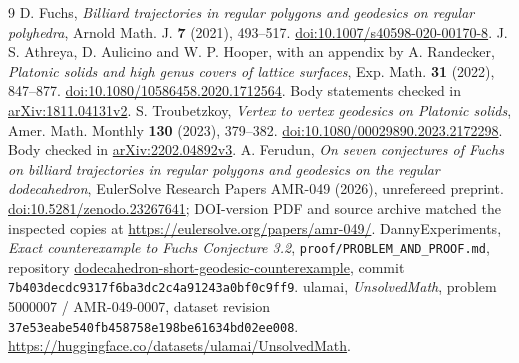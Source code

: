 \documentclass[11pt]{amsart}
\theoremstyle{remark}
\begin{document}
\begin{thebibliography}{9}
D. Fuchs, \emph{Billiard trajectories in regular polygons and geodesics on regular polyhedra},
Arnold Math. J. \textbf{7} (2021), 493--517.
\href{https://doi.org/10.1007/s40598-020-00170-8}{doi:10.1007/s40598-020-00170-8}.
J. S. Athreya, D. Aulicino and W. P. Hooper, with an appendix by A. Randecker,
\emph{Platonic solids and high genus covers of lattice surfaces},
Exp. Math. \textbf{31} (2022), 847--877.
\href{https://doi.org/10.1080/10586458.2020.1712564}{doi:10.1080/10586458.2020.1712564}.
Body statements checked in \href{https://arxiv.org/abs/1811.04131v2}{arXiv:1811.04131v2}.
S. Troubetzkoy, \emph{Vertex to vertex geodesics on Platonic solids},
Amer. Math. Monthly \textbf{130} (2023), 379--382.
\href{https://doi.org/10.1080/00029890.2023.2172298}{doi:10.1080/00029890.2023.2172298}.
Body checked in \href{https://arxiv.org/abs/2202.04892v3}{arXiv:2202.04892v3}.
A. Ferudun, \emph{On seven conjectures of Fuchs on billiard trajectories in regular polygons and geodesics on the regular dodecahedron},
EulerSolve Research Papers AMR-049 (2026), unrefereed preprint.
\href{https://doi.org/10.5281/zenodo.23267641}{doi:10.5281/zenodo.23267641};
DOI-version PDF and source archive matched the inspected copies at \url{https://eulersolve.org/papers/amr-049/}.
DannyExperiments, \emph{Exact counterexample to Fuchs Conjecture 3.2},
\texttt{proof/PROBLEM\_AND\_PROOF.md}, repository
\href{https://github.com/DannyExperiments/dodecahedron-short-geodesic-counterexample}{dodecahedron-short-geodesic-counterexample},
commit \texttt{7b403decdc9317f6ba3dc2c4a91243a0bf0c9ff9}.
ulamai, \emph{UnsolvedMath}, problem 5000007 / AMR-049-0007,
dataset revision \texttt{37e53eabe540fb458758e198be61634bd02ee008}.
\url{https://huggingface.co/datasets/ulamai/UnsolvedMath}.
\end{thebibliography}
\end{document}
